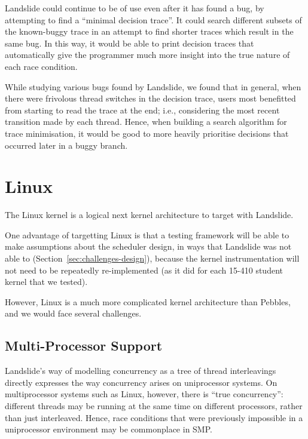 Landslide could continue to be of use even after it has found a bug, by attempting to find a ``minimal decision trace''. It could search different subsets of the known-buggy trace in an attempt to find shorter traces which result in the same bug.
In this way, it would be able to print decision traces that automatically give the programmer much more insight into the true nature of each race condition.

While studying various bugs found by Landslide, we found that in general, when there were frivolous thread switches in the decision trace, users most benefitted from starting to read the trace at the end; i.e., considering the most recent transition made by each thread. Hence, when building a search algorithm for trace minimisation, it would be good to more heavily prioritise decisions that occurred later in a buggy branch.

\section{Linux}
\label{sec:future-linux}

The Linux kernel is a logical next kernel architecture to target with Landslide.

One advantage of targetting Linux is that a testing framework will be able to make assumptions about the scheduler design, in ways that Landslide was not able to (Section~\ref{sec:challenges-design}), because the kernel instrumentation will not need to be repeatedly re-implemented (as it did for each 15-410 student kernel that we tested).

However, Linux is a much more complicated kernel architecture than Pebbles, and we would face several challenges.

\subsection{Multi-Processor Support}

Landslide's way of modelling concurrency as a tree of thread interleavings directly expresses the way concurrency arises on uniprocessor systems. On multiprocessor systems such as Linux, however, there is ``true concurrency'': different threads may be running at the same time on different processors, rather than just interleaved. Hence, race conditions that were previously impossible in a uniprocessor environment may be commonplace in SMP.

